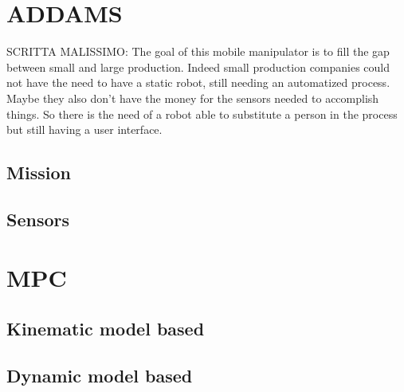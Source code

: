 \section{ADDAMS}
SCRITTA MALISSIMO: The goal of this mobile manipulator is to fill the gap between small and large production. Indeed small production companies could not have the need to have a static robot, still needing an automatized process.  Maybe they also don’t have the money for the sensors needed to accomplish things. So there is the need of a robot able to substitute a person in the process but still having a user interface. 
\subsection{Mission}
\subsection{Sensors}
\section{MPC}
\subsection{Kinematic model based}
\subsection{Dynamic model based}
